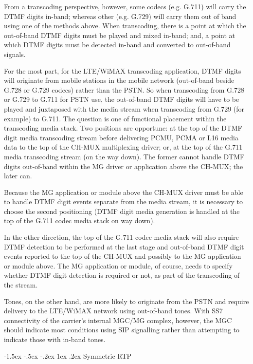 \documentclass[letterpaper,final,notitlepage,twocolumn,10pt,twoside]{article}
\makeatletter
\let\normalsize = \small
\let\small = \footnotesize
\let\footnotesize = \scriptsize
\let\scriptsize = \tiny
\renewcommand\subsection{\@startsection{subsection}{2}{\z@}%
                                     {-1.5ex \@plus -.5ex \@minus -.2ex}%
                                     {1ex \@plus .2ex}%
                                     {\normalfont\normalsize\bfseries}}
\makeatother
\begin{document}
From a transcoding perspective, however, some codecs (e.g. G.711) will carry the
DTMF digits in-band; whereas other (e.g. G.729) will carry them out of band
using one of the methods above.  When transcoding, there is a point at which the
out-of-band DTMF digits must be played and mixed in-band; and, a point at which
DTMF digits must be detected in-band and converted to out-of-band signals.

For the most part, for the LTE/WiMAX transcoding application, DTMF digits will
originate from mobile stations in the mobile network (out-of-band beside G.728
or G.729 codecs) rather than the PSTN.  So when transcoding from G.728 or G.729
to G.711 for PSTN  use, the out-of-band DTMF digits will have to be played and
juxtaposed with the media stream when transcoding from G.729 (for example) to
G.711.  The question is one of functional placement within the transcoding media
stack.  Two positions are opportune: at the top of the DTMF digit media
transcoding stream before delivering PCMU, PCMA or L16 media data to the top of
the CH-MUX multiplexing driver; or, at the top of the G.711 media transcoding
stream (on the way down).  The former cannot handle DTMF digits out-of-band
within the MG driver or application above the CH-MUX; the later can.

Because the MG application or module above the CH-MUX driver must be able to
handle DTMF digit events separate from the media stream, it is necessary to
choose the second positioning (DTMF digit media generation is handled at the top
of the G.711 codec media stack on way down).

In the other direction, the top of the G.711 codec media stack will also require
DTMF detection to be performed at the last stage and out-of-band DTMF digit
events reported to the top of the CH-MUX and possibly to the MG application or
module above.  The MG application or module, of course, needs to specify whether
DTMF digit detection is required or not, as part of the transcoding of the
stream.

Tones, on the other hand, are more likely to originate from the PSTN and require
delivery to the LTE/WiMAX network using out-of-band tones.  With SS7
connectivity of the carrier's internal MGC/MG complex, however, the MGC should
indicate most conditions using SIP signalling rather than attempting to indicate
those with in-band tones.

\subsection{Symmetric RTP}
\label{section:symrtp}
\end{document}

